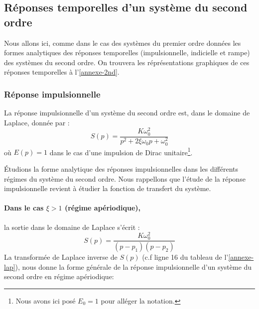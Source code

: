 \subsection{Réponses temporelles d'un système du second ordre}
Nous allons ici, comme dans le cas des systèmes du premier ordre données 
les formes analytiques des réponses temporelles (impulsionnelle, indicielle 
et rampe) des systèmes du second ordre. On trouvera les réprésentations 
graphiques de ces réponses temporelles à l'\cref{annexe-2nd}.
\subsubsection{Réponse impulsionnelle}

La réponse impulsionnelle d'un système du second ordre est, dans le domaine 
de Laplace, donnée par :
$$
S(p)=\dfrac{K\omega_0^2}{p^2+2\xi\omega_0p+\omega_0^2}
$$
où $E(p)=1$ dans le cas d'une impulsion de Dirac unitaire\footnote{Nous avons 
ici posé $E_0=1$ pour alléger la notation.}.

\'Etudions la forme analytique des réponses impulsionnelles dans les 
différents régimes du système du second ordre. Nous rappellons que l'étude 
de la réponse impulsionnelle revient à étudier la fonction de 
transfert du système. 

\paragraph{Dans le cas $\xi>1$ (régime apériodique),}
la sortie dans le domaine de Laplace s'écrit :
$$
S(p)=\dfrac{K\omega^2_0}{(p-p_1)(p-p_2)}
$$
La transformée de Laplace inverse de $S(p)$ (c.f ligne 16 du tableau 
de l'\cref{annexe-lap}), nous donne la forme générale de la réponse 
impulsionnelle d'un système du second ordre en régime apériodique:

